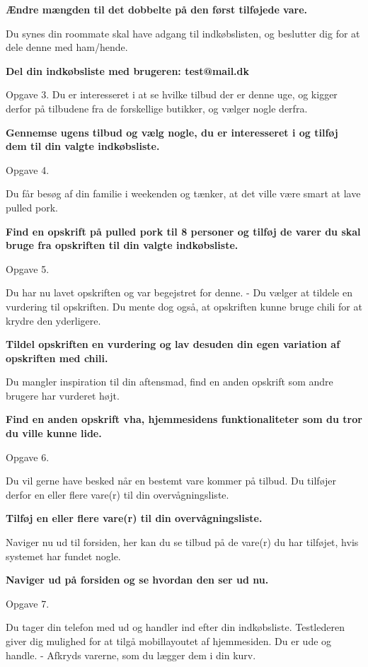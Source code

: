 \textbf{Ændre mængden til det dobbelte på den først tilføjede vare.}

Du synes din roommate skal have adgang til indkøbslisten, og beslutter dig for at dele denne med ham/hende.

\textbf{Del din indkøbsliste med brugeren: test@mail.dk}

Opgave 3.
Du er interesseret i at se hvilke tilbud der er denne uge, og kigger derfor på tilbudene fra de forskellige butikker, og vælger nogle derfra.

\textbf{Gennemse ugens tilbud og vælg nogle, du er interesseret i og tilføj dem til din valgte indkøbsliste.}

Opgave 4.

Du får besøg af din familie i weekenden og tænker, at det ville være smart at lave pulled pork.

\textbf{Find en opskrift på pulled pork til 8 personer og tilføj de varer du skal bruge fra opskriften til din valgte indkøbsliste.}

Opgave 5.

Du har nu lavet opskriften og var begejstret for denne. 
- Du vælger at tildele en vurdering til opskriften.
Du mente dog også, at opskriften kunne bruge chili for at krydre den yderligere.

\textbf{Tildel opskriften en vurdering og lav desuden din egen variation af opskriften med chili.}

Du mangler inspiration til din aftensmad, find en anden opskrift som andre brugere har vurderet højt.

\textbf{Find en anden opskrift vha, hjemmesidens funktionaliteter som du tror du ville kunne lide.}

Opgave 6.

Du vil gerne have besked når en bestemt vare kommer på tilbud. 
Du tilføjer derfor en eller flere vare(r) til din overvågningsliste.

\textbf{Tilføj en eller flere vare(r) til din overvågningsliste.}

Naviger nu ud til forsiden, her kan du se tilbud på de vare(r) du har tilføjet, hvis systemet har fundet nogle.

\textbf{Naviger ud på forsiden og se hvordan den ser ud nu.}


Opgave 7.

Du tager din telefon med ud og handler ind efter din indkøbsliste. 
Testlederen giver dig mulighed for at tilgå mobillayoutet af hjemmesiden. 
Du er ude og handle. 
- Afkryds varerne, som du lægger dem i din kurv.


